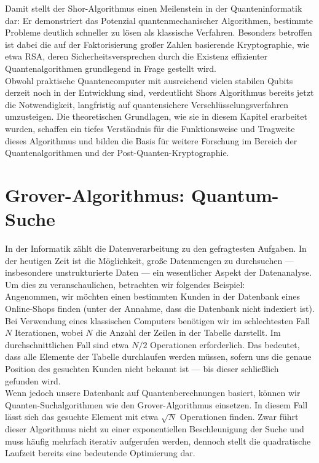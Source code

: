 Damit stellt der Shor-Algorithmus einen Meilenstein in der Quanteninformatik dar: Er demonstriert das Potenzial quantenmechanischer Algorithmen, bestimmte Probleme deutlich schneller zu lösen als klassische Verfahren. Besonders betroffen ist dabei die auf der Faktorisierung großer Zahlen basierende Kryptographie, wie etwa RSA, deren Sicherheitsversprechen durch die Existenz effizienter Quantenalgorithmen grundlegend in Frage gestellt wird.\\

Obwohl praktische Quantencomputer mit ausreichend vielen stabilen Qubits derzeit noch in der Entwicklung sind, verdeutlicht Shors Algorithmus bereits jetzt die Notwendigkeit, langfristig auf quantensichere Verschlüsselungsverfahren umzusteigen. Die theoretischen Grundlagen, wie sie in diesem Kapitel erarbeitet wurden, schaffen ein tiefes Verständnis für die Funktionsweise und Tragweite dieses Algorithmus und bilden die Basis für weitere Forschung im Bereich der Quantenalgorithmen und der Post-Quanten-Kryptographie.

\section{Grover-Algorithmus: Quantum-Suche}
\label{sec:grover-algorithm}
In der Informatik zählt die Datenverarbeitung zu den gefragtesten Aufgaben. In der heutigen Zeit ist die Möglichkeit, große Datenmengen zu durchsuchen — insbesondere unstrukturierte Daten — ein wesentlicher Aspekt der Datenanalyse. Um dies zu veranschaulichen, betrachten wir folgendes Beispiel:\\ 

Angenommen, wir möchten einen bestimmten Kunden in der Datenbank eines Online-Shops finden (unter der Annahme, dass die Datenbank nicht indexiert ist). Bei Verwendung eines klassischen Computers benötigen wir im schlechtesten Fall $N$ Iterationen, wobei $N$ die Anzahl der Zeilen in der Tabelle darstellt. Im durchschnittlichen Fall sind etwa $N/2$ Operationen erforderlich. Das bedeutet, dass alle Elemente der Tabelle durchlaufen werden müssen, sofern uns die genaue Position des gesuchten Kunden nicht bekannt ist — bis dieser schließlich gefunden wird.\\

Wenn jedoch unsere Datenbank auf Quantenberechnungen basiert, können wir Quanten-Suchalgorithmen wie den Grover-Algorithmus einsetzen. In diesem Fall lässt sich das gesuchte Element mit etwa $\sqrt{N}$ Operationen finden. Zwar führt dieser Algorithmus nicht zu einer exponentiellen Beschleunigung der Suche und muss häufig mehrfach iterativ aufgerufen werden, dennoch stellt die quadratische Laufzeit bereits eine bedeutende Optimierung dar.

